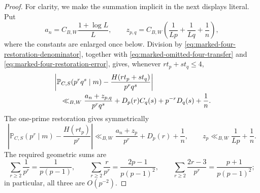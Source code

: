 \documentclass[11pt]{article}
\numberwithin{equation}{section}
\theoremstyle{definition}
\theoremstyle{remark}
\newcommand{\1}{\mathbf 1}
\begin{document}
\begin{proof}
For clarity, we make the summation implicit in the next displays
literal.  Put
\[
 a_n=C_{B,W}\frac{1+\log L}{L},\qquad
 z_{p,q}=C_{B,W}\left(\frac1{Lp}+\frac1{Lq}+\frac1n\right),
\]
where the constants are enlarged once below.  Division by
\eqref{eq:marked-four-restoration-denominator}, together with
\eqref{eq:marked-omitted-four-transfer} and
\eqref{eq:marked-four-restoration-error}, gives, whenever
\(rt_p+st_q\le4\),
\begin{align}
 &\left|\mathbb P_{C,S}(p^rq^s\mid m)
       -\frac{H(rt_p+st_q)}{p^rq^s}\right|\notag\\
 &\quad\ll_{B,W}
 \frac{a_n+z_{p,q}}{p^rq^s}
 +D_p(r)C_q(s)+p^{-r}D_q(s)+\frac1n.
 \label{eq:marked-four-pointwise-error-ledger}
\end{align}
The one-prime restoration gives symmetrically
\begin{equation}
 \left|\mathbb P_{C,S}(p^r\mid m)-\frac{H(rt_p)}{p^r}\right|
 \ll_{B,W}\frac{a_n+z_p}{p^r}+D_p(r)+\frac1n,
 \qquad z_p\ll_{B,W}\frac1{Lp}+\frac1n.
 \label{eq:marked-four-marginal-pointwise-ledger}
\end{equation}
The required geometric sums are
\begin{equation}
 \sum_{r\ge2}\frac1{p^r}=\frac1{p(p-1)},\qquad
 \sum_{r\ge2}\frac r{p^r}=\frac{2p-1}{p(p-1)^2},\qquad
 \sum_{r\ge2}\frac{2r-3}{p^r}=\frac{p+1}{p(p-1)^2};
 \label{eq:marked-four-geometric-ledger}
\end{equation}
in particular, all three are \(O(p^{-2})\).


\end{proof}
\end{document}
